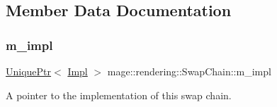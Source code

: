 \subsection{Member Data Documentation}
\mbox{\label{classmage_1_1rendering_1_1_swap_chain_a983645d6494b7e731753def5356bb8e6}} 
\subsubsection{\texorpdfstring{m\+\_\+impl}{m\_impl}}
{\footnotesize\ttfamily \mbox{\hyperlink{namespacemage_a3316d7143a973e37adf1110f2e80ca31}{Unique\+Ptr}}$<$ \mbox{\hyperlink{classmage_1_1rendering_1_1_swap_chain_1_1_impl}{Impl}} $>$ mage\+::rendering\+::\+Swap\+Chain\+::m\+\_\+impl\hspace{0.3cm}{\ttfamily [private]}}

A pointer to the implementation of this swap chain. 